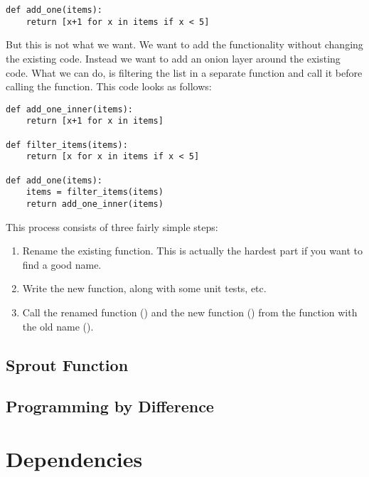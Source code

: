 \begin{programcode}{}
\begin{verbatim}
def add_one(items):
    return [x+1 for x in items if x < 5]
\end{verbatim}
\end{programcode}

But this is not what we want. We want to add the functionality without changing the existing code. Instead we want to add an onion layer around the existing code. What we can do, is filtering the list in a separate function and call it before calling the  function. This code looks as follows:

\begin{programcode}{}
\begin{verbatim}
def add_one_inner(items):
    return [x+1 for x in items]

def filter_items(items):
    return [x for x in items if x < 5]

def add_one(items):
    items = filter_items(items)
    return add_one_inner(items)
\end{verbatim}
\end{programcode}

This process consists of three fairly simple steps:
\begin{enumerate}
    \item Rename the existing function. This is actually the hardest part if you want to find a good name.
    \item Write the new function, along with some unit tests, etc.
    \item Call the renamed function () and the new function \newline() from the function with the old name ().
\end{enumerate}

\section{Sprout Function}

\section{Programming by Difference}

\chapter{Dependencies}

